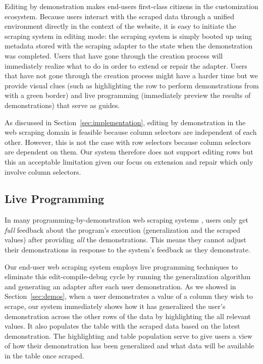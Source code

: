 \documentclass[sigconf,10pt]{acmart}
\begin{document}
Editing by demonstration makes end-users first-class citizens in the
customization ecosystem. Because users interact with the scraped data
through a unified environment directly in the context of the website, it
is easy to initiate the scraping system in editing mode: the scraping
system is simply booted up using metadata stored with the scraping
adapter to the state when the demonstration was completed. Users that
have gone through the creation process will immediately realize what to
do in order to extend or repair the adapter. Users that have not gone
through the creation process might have a harder time but we provide
visual clues (such as highlighting the row to perform demonstrations
from with a green border) and live programming (immediately preview the
results of demonstrations) that serve as guides.

As discussed in Section~\ref{sec:implementation}, editing by
demonstration in the web scraping domain is feasible because column
selectors are independent of each other. However, this is not the case
with row selectors because column selectors are dependent on them. Our
system therefore does not support editing rows but this an acceptable
limitation given our focus on extension and repair which only involve
column selectors.

\hypertarget{live-programming-1}{%
\subsection{Live Programming}\label{live-programming-1}}

In many programming-by-demonstration web scraping systems
\citep{chasins2018, lin2009}, users only get \emph{full} feedback about
the program's execution (generalization and the scraped values) after
providing \emph{all} the demonstrations. This means they cannot adjust
their demonstrations in response to the system's feedback as they
demonstrate.

Our end-user web scraping system employs live programming techniques to
eliminate this edit-compile-debug cycle by running the generalization
algorithm and generating an adapter after each user demonstration. As we
showed in Section~\ref{sec:demos}, when a user demonstrates a value of a
column they wish to scrape, our system immediately shows how it has
generalized the user's demonstration across the other rows of the data
by highlighting the all relevant values. It also populates the table
with the scraped data based on the latest demonstration. The
highlighting and table population serve to give users a view of how
their demonstration has been generalized and what data will be available
in the table once scraped.
\end{document}
